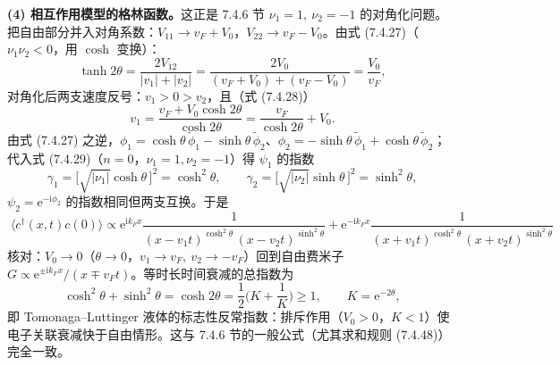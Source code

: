 \textbf{(4) 相互作用模型的格林函数。}这正是 7.4.6 节 $\nu_1=1,\ \nu_2=-1$ 的对角化问题。把自由部分并入对角系数：$V_{11}\to v_F+V_0$，$V_{22}\to v_F-V_0$。由式 (7.4.27)（$\nu_1\nu_2<0$，用 $\cosh$ 变换）：
\begin{equation*}
\tanh 2\theta=\frac{2V_{12}}{|v_1|+|v_2|}=\frac{2V_0}{(v_F+V_0)+(v_F-V_0)}=\frac{V_0}{v_F},
\end{equation*}
对角化后两支速度反号：$v_1>0>v_2$，且（式 (7.4.28)）
\begin{equation*}
v_1=\frac{v_F+V_0\cosh2\theta}{\cosh2\theta}=\frac{v_F}{\cosh2\theta}+V_0 .
\end{equation*}
由式 (7.4.27) 之逆，$\phi_1=\cosh\theta\,\tilde{\phi}_1-\sinh\theta\,\tilde{\phi}_2$、$\phi_2=-\sinh\theta\,\tilde{\phi}_1+\cosh\theta\,\tilde{\phi}_2$；代入式 (7.4.29)（$n=0$，$\nu_1=1,\nu_2=-1$）得 $\psi_1$ 的指数
\begin{equation*}
\gamma_1=\big[\sqrt{|\nu_1|}\cosh\theta\,\big]^2=\cosh^2\theta,
\qquad
\gamma_2=\big[\sqrt{|\nu_2|}\sinh\theta\,\big]^2=\sinh^2\theta ,
\end{equation*}
$\psi_2=\mathrm{e}^{-\mathrm{i}\phi_2}$ 的指数相同但两支互换。于是
\begin{equation*}
\boxed{\;
\langle c^{\dagger}(x,t)c(0)\rangle
\propto\mathrm{e}^{\mathrm{i}k_Fx}\frac{1}{(x-v_1t)^{\cosh^2\theta}\,(x-v_2t)^{\sinh^2\theta}}
+\mathrm{e}^{-\mathrm{i}k_Fx}\frac{1}{(x+v_1t)^{\cosh^2\theta}\,(x+v_2t)^{\sinh^2\theta}}\;}
\end{equation*}
核对：$V_0\to0$（$\theta\to0$，$v_1\to v_F,\ v_2\to-v_F$）回到自由费米子 $G\propto\mathrm{e}^{\pm\mathrm{i}k_Fx}/(x\mp v_Ft)$。等时长时间衰减的总指数为
\begin{equation*}
\cosh^2\theta+\sinh^2\theta=\cosh2\theta=\frac12\Big(K+\frac1K\Big)\geqslant1,
\qquad K=\mathrm{e}^{-2\theta},
\end{equation*}
即 Tomonaga--Luttinger 液体的标志性反常指数：排斥作用（$V_0>0$，$K<1$）使电子关联衰减快于自由情形。这与 7.4.6 节的一般公式（尤其求和规则 (7.4.48)）完全一致。

